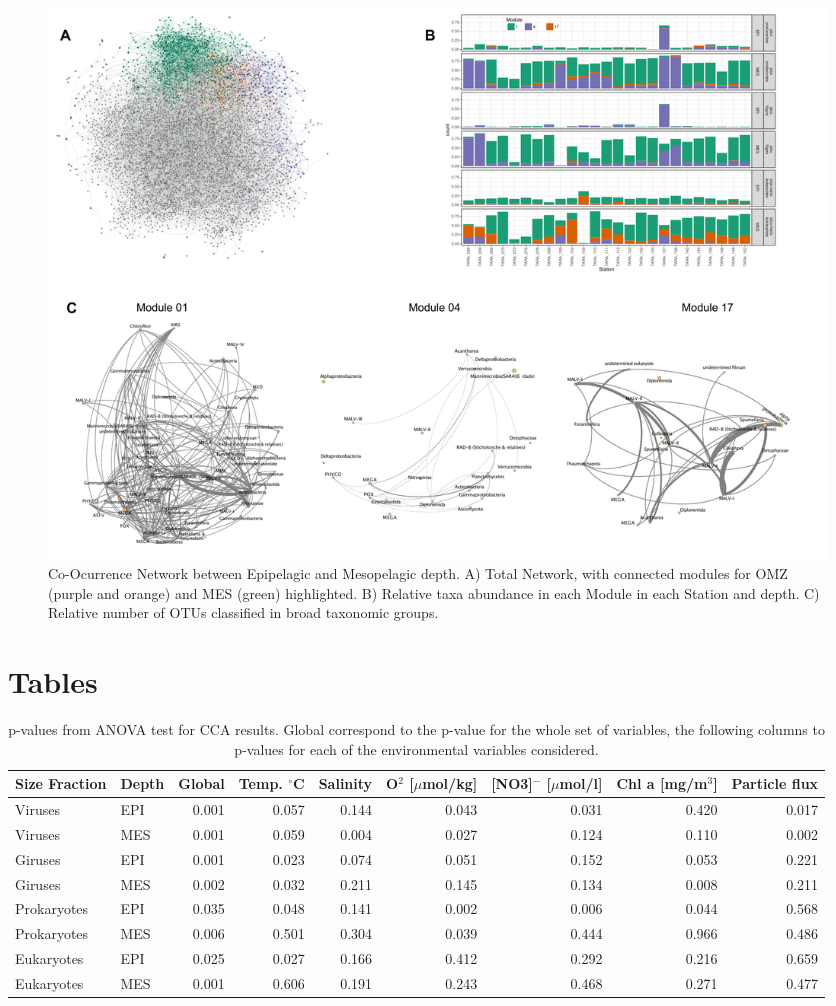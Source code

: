 \documentclass[fleqn,10pt]{wlscirep}
\begin{document}
\clearpage
\begin{figure}[ht]
    \centering
    \includegraphics[scale=0.5]{images/Networks_Composite_v2.pdf}
    \caption{Co-Ocurrence Network between Epipelagic and Mesopelagic depth. A) Total Network, with connected modules for OMZ (purple and orange) and MES (green) highlighted. B) Relative taxa abundance in each Module in each Station and depth. C) Relative number of OTUs classified in broad taxonomic groups.}
    \label{fig:networks}
\end{figure}
\clearpage

\section*{Tables}

\begin{table}[ht]
\centering
\begin{tabular}{llrrrrrrr}
\hline
 Size Fraction& Depth & Global & Temp. $^\circ$C & Salinity & O$^2$ [$\mu$mol/kg] &[NO3]$^-$  [$\mu$mol/l]	& Chl a [mg/m$^3$] &	 Particle flux\\
\hline
\hline
Viruses & EPI & 0.001 & 0.057 & 0.144 & 0.043 & 0.031 & 0.420 & 0.017\\
Viruses & MES & 0.001 & 0.059 & 0.004 & 0.027 & 0.124 & 0.110 & 0.002\\
Giruses & EPI & 0.001 & 0.023 & 0.074 & 0.051 & 0.152 & 0.053 & 0.221\\
Giruses & MES & 0.002 & 0.032 & 0.211 & 0.145 & 0.134 & 0.008 & 0.211\\
Prokaryotes & EPI & 0.035 & 0.048 & 0.141 & 0.002 & 0.006 & 0.044 & 0.568\\
Prokaryotes & MES & 0.006 & 0.501 & 0.304 & 0.039 & 0.444 & 0.966 & 0.486\\
Eukaryotes & EPI & 0.025 & 0.027 & 0.166 & 0.412 & 0.292 & 0.216 & 0.659\\
Eukaryotes & MES & 0.001 & 0.606 & 0.191 & 0.243 & 0.468 & 0.271 & 0.477\\
\hline
\hline
\end{tabular}
\caption{\label{tab:CCA} p-values from ANOVA test for CCA results. Global correspond to the p-value for the whole set of variables, the following columns to p-values for each of the environmental variables considered.}
\end{table}
\end{document}

